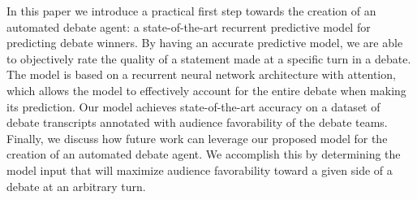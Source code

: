 In this paper we introduce a practical first step towards the creation of an automated debate agent: a state-of-the-art recurrent predictive model for predicting debate winners. By having an accurate predictive model, we are able to objectively rate the quality of a statement made at a specific turn in a debate. The model is based on a recurrent neural network architecture with attention, which allows the model to effectively account for the entire debate when making its prediction. Our model achieves state-of-the-art accuracy on a dataset of debate transcripts annotated with audience favorability of the debate teams. Finally, we discuss how future work can leverage our proposed model for the creation of an automated debate agent. We accomplish this by determining the model input that will maximize audience favorability toward a given side of a debate at an arbitrary turn.
